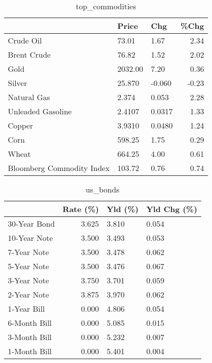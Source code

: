 \documentclass{article}%
\begin{document}
\begin{table}[htbp]%
\caption{top\_commodities}%
\centering%
\begin{adjustbox}{width=1\textwidth}%
\begin{tabular}{lllr}
\toprule
                          &   Price &    Chg &  \%Chg \\
\midrule
               Crude Oil  &   73.01 &   1.67 &  2.34 \\
             Brent Crude  &   76.82 &   1.52 &  2.02 \\
                    Gold  & 2032.00 &   7.20 &  0.36 \\
                  Silver  &  25.870 & -0.060 & -0.23 \\
             Natural Gas  &   2.374 &  0.053 &  2.28 \\
       Unleaded Gasoline  &  2.4107 & 0.0317 &  1.33 \\
                  Copper  &  3.9310 & 0.0480 &  1.24 \\
                    Corn  &  598.25 &   1.75 &  0.29 \\
                   Wheat  &  664.25 &   4.00 &  0.61 \\
Bloomberg Commodity Index &  103.72 &   0.76 &  0.74 \\
\bottomrule
\end{tabular}
%
\end{adjustbox}%
\end{table}

%


\begin{table}[htbp]%
\caption{us\_bonds}%
\centering%
\begin{adjustbox}{width=1\textwidth}%
\begin{tabular}{lrll}
\toprule
             &  Rate (\%) & Yld (\%) & Yld Chg (\%) \\
\midrule
30-Year Bond &     3.625 &   3.810 &       0.054 \\
10-Year Note &     3.500 &   3.493 &       0.053 \\
 7-Year Note &     3.500 &   3.478 &       0.062 \\
 5-Year Note &     3.500 &   3.476 &       0.067 \\
 3-Year Note &     3.750 &   3.701 &       0.059 \\
 2-Year Note &     3.875 &   3.970 &       0.062 \\
 1-Year Bill &     0.000 &   4.806 &       0.054 \\
6-Month Bill &     0.000 &   5.085 &       0.015 \\
3-Month Bill &     0.000 &   5.232 &       0.007 \\
1-Month Bill &     0.000 &   5.401 &       0.004 \\
\bottomrule
\end{tabular}
%
\end{adjustbox}%
\end{table}
\end{document}
